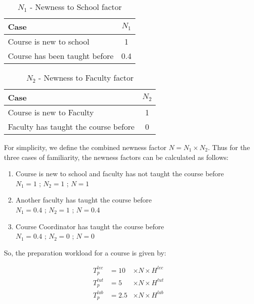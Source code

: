 \begin{table}[ht]
  \centering
  \begin{tabular}{|l|c|}
    \hline
    \textbf{Case}                 & \textbf{\(N_1\)} \\ \hline
    Course is new to school       & 1                \\ \hline
    Course has been taught before & 0.4              \\ \hline
  \end{tabular}
  \caption{\(N_1\) - Newness to School factor}
  \label{tab:n1-workload-factor}
\end{table}

\begin{table}[ht]
  \centering
  \begin{tabular}{|l|c|}
    \hline
    \textbf{Case}                        & \textbf{\(N_2\)} \\ \hline
    Course is new to Faculty             & 1                \\ \hline
    Faculty has taught the course before & 0                \\ \hline
  \end{tabular}
  \caption{\(N_2\) - Newness to Faculty factor}
  \label{tab:n2-workload-factor}
\end{table}

For simplicity, we define the combined newness factor \(N = N_1 \times N_2\). Thus for the three cases of familiarity, the newness factors can be calculated as follows:

\begin{enumerate}
  \item Course is new to school and faculty has not taught the course before       \\
        \(N_1 = 1\) ; \(N_2 = 1\) ; \(N = 1\)
  \item Another faculty has taught the course before \\
        \(N_1 = 0.4\) ; \(N_2 = 1\) ; \(N = 0.4\)
  \item Course Coordinator has taught the course before     \\
        \(N_1 = 0.4\) ; \(N_2 = 0\) ; \(N = 0\)
\end{enumerate}

So, the preparation workload for a course is given by:

\begin{equation}
  \label{eqn:preparation-workload}
  \begin{aligned}
    T_p^{lec} & = 10  & \times N \times H^{lec} \\
    T_p^{tut} & = 5   & \times N \times H^{tut} \\
    T_p^{lab} & = 2.5 & \times N \times H^{lab}
  \end{aligned}
\end{equation}

